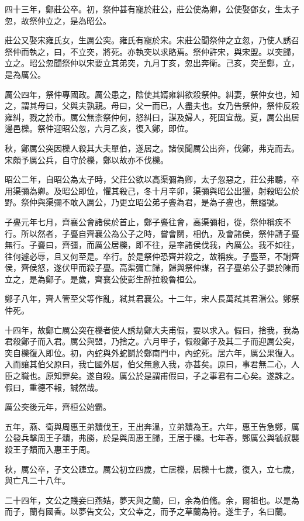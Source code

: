四十三年，鄭莊公卒。初，祭仲甚有寵於莊公，莊公使為卿，公使娶鄧女，生太子忽，故祭仲立之，是為昭公。

莊公又娶宋雍氏女，生厲公突。雍氏有寵於宋。宋莊公聞祭仲之立忽，乃使人誘召祭仲而執之，曰，不立突，將死。亦執突以求賂焉。祭仲許宋，與宋盟。以突歸，立之。昭公忽聞祭仲以宋要立其弟突，九月丁亥，忽出奔衛。己亥，突至鄭，立，是為厲公。

厲公四年，祭仲專國政。厲公患之，陰使其婿雍糾欲殺祭仲。糾妻，祭仲女也，知之，謂其母曰，父與夫孰親。母曰，父一而已，人盡夫也。女乃告祭仲，祭仲反殺雍糾，戮之於市。厲公無柰祭仲何，怒糾曰，謀及婦人，死固宜哉。夏，厲公出居邊邑櫟。祭仲迎昭公忽，六月乙亥，復入鄭，即位。

秋，鄭厲公突因櫟人殺其大夫單伯，遂居之。諸侯聞厲公出奔，伐鄭，弗克而去。宋頗予厲公兵，自守於櫟，鄭以故亦不伐櫟。

昭公二年，自昭公為太子時，父莊公欲以高渠彌為卿，太子忽惡之，莊公弗聽，卒用渠彌為卿。及昭公即位，懼其殺己，冬十月辛卯，渠彌與昭公出獵，射殺昭公於野。祭仲與渠彌不敢入厲公，乃更立昭公弟子亹為君，是為子亹也，無謚號。

子亹元年七月，齊襄公會諸侯於首止，鄭子亹往會，高渠彌相，從，祭仲稱疾不行。所以然者，子亹自齊襄公為公子之時，嘗會鬬，相仇，及會諸侯，祭仲請子亹無行。子亹曰，齊彊，而厲公居櫟，即不往，是率諸侯伐我，內厲公。我不如往，往何遽必辱，且又何至是。卒行。於是祭仲恐齊并殺之，故稱疾。子亹至，不謝齊侯，齊侯怒，遂伏甲而殺子亹。高渠彌亡歸，歸與祭仲謀，召子亹弟公子嬰於陳而立之，是為鄭子。是歲，齊襄公使彭生醉拉殺魯桓公。

鄭子八年，齊人管至父等作亂，弒其君襄公。十二年，宋人長萬弒其君湣公。鄭祭仲死。

十四年，故鄭亡厲公突在櫟者使人誘劫鄭大夫甫假，要以求入。假曰，捨我，我為君殺鄭子而入君。厲公與盟，乃捨之。六月甲子，假殺鄭子及其二子而迎厲公突，突自櫟復入即位。初，內蛇與外蛇鬬於鄭南門中，內蛇死。居六年，厲公果復入。入而讓其伯父原曰，我亡國外居，伯父無意入我，亦甚矣。原曰，事君無二心，人臣之職也。原知罪矣。遂自殺。厲公於是謂甫假曰，子之事君有二心矣。遂誅之。假曰，重德不報，誠然哉。

厲公突後元年，齊桓公始霸。

五年，燕、衛與周惠王弟穨伐王，王出奔溫，立弟穨為王。六年，惠王告急鄭，厲公發兵擊周王子穨，弗勝，於是與周惠王歸，王居于櫟。七年春，鄭厲公與虢叔襲殺王子穨而入惠王于周。

秋，厲公卒，子文公踕立。厲公初立四歲，亡居櫟，居櫟十七歲，復入，立七歲，與亡凡二十八年。

二十四年，文公之賤妾曰燕姞，夢天與之蘭，曰，余為伯鯈。余，爾祖也。以是為而子，蘭有國香。以夢告文公，文公幸之，而予之草蘭為符。遂生子，名曰蘭。

